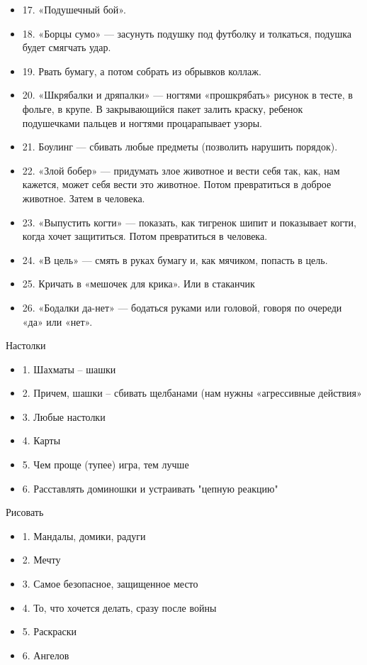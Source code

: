 \begin{itemize}
  \item 17. «Подушечный бой».
  \item 18. «Борцы сумо» — засунуть подушку под футболку и толкаться, подушка будет смягчать удар.
  \item 19. Рвать бумагу, а потом собрать из обрывков коллаж.
  \item 20. «Шкрябалки и дряпалки» — ногтями «прошкрябать» рисунок в тесте, в фольге, в крупе. В закрывающийся пакет залить краску, ребенок подушечками пальцев и ногтями процарапывает узоры.
  \item 21. Боулинг — сбивать любые предметы (позволить нарушить порядок).
  \item 22. «Злой бобер» — придумать злое животное и вести себя так, как, нам кажется, может себя вести это животное. Потом превратиться в доброе животное. Затем в человека.
  \item 23. «Выпустить когти» — показать, как тигренок шипит и показывает когти, когда хочет защититься. Потом превратиться в человека.
  \item 24. «В цель» — смять в руках бумагу и, как мячиком, попасть в цель.
  \item 25. Кричать в «мешочек для крика». Или в стаканчик
  \item 26. «Бодалки да-нет» — бодаться руками или головой, говоря по очереди «да» или «нет».
\end{itemize}



 Настолки

\begin{itemize}
  \item 1. Шахматы – шашки
  \item 2. Причем, шашки – сбивать щелбанами (нам нужны «агрессивные действия»
  \item 3. Любые настолки
  \item 4. Карты
  \item 5. Чем проще (тупее) игра, тем лучше
  \item 6. Расставлять доминошки и устраивать "цепную реакцию"
\end{itemize}


 Рисовать

\begin{itemize}
  \item 1. Мандалы, домики, радуги
  \item 2. Мечту
  \item 3. Самое безопасное, защищенное место
  \item 4. То, что хочется делать, сразу после войны
  \item 5. Раскраски
  \item 6. Ангелов
\end{itemize}




